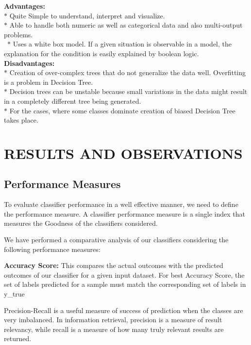 \documentclass[a4paper, 10pt, conference]{IEEEtran}
\begin{document}
\textbf{Advantages:}\\
\indent $\ast$ Quite Simple to understand, interpret and visualize.\\
\indent $\ast$ Able to handle both numeric as well as categorical data and also multi-output problems.\\\
\indent $\ast$ Uses a white box model. If a given situation is observable in a model, the explanation for the condition is easily explained by boolean logic.\\

\textbf{Disadvantages:}\\
\indent $\ast$ Creation of over-complex trees that do not generalize the data well. Overfitting is a problem in  Decision Tree.\\
\indent $\ast$ Decision trees can be unstable because small variations in the data might result in a completely different tree being generated.\\
\indent $\ast$ For the cases, where some classes dominate creation of biased Decision Tree takes place.\\


\section{RESULTS AND OBSERVATIONS}

\subsection{Performance Measures}
To evaluate classifier performance in a well effective manner, we need to define the performance measure. A classifier performance measure is a single index that measures the Goodness of the classifiers considered.

We have performed a comparative analysis of our classifiers considering the following performance measures:

\textbf{Accuracy Score:}
This compares the actual outcomes with the predicted outcomes of our classifier for a given input dataset. For best Accuracy Score, the set of labels predicted for a sample must match the corresponding set of labels in y\_true

Precision-Recall is a useful measure of success of prediction when the classes are very imbalanced. In information retrieval, precision is a measure of result relevancy, while recall is a measure of how many truly relevant results are returned.
\end{document}
